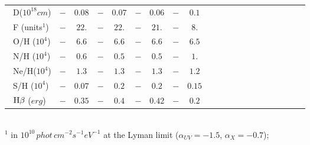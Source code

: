 \documentclass[../thesis.tex]{subfiles}
\begin{document}
\begin{landscape}
\begin{table}
\begin{tabular}{lcccccccccccccccccccc}
\ D($10^{18}\si{cm}$)      &$  -   $&$0.08   $&$  -    $&$0.07 $&$ -   $&$0.06 $&$-    $&$0.1$\\
\ F (units$^1$)       &$ -    $&$ 22.   $&$  -    $&$22. $&$  -   $&$21.  $&$-    $&$8. $\\
\ O/H ($10^{4}$)     &$ -    $&$ 6.6   $&$  -    $&$6.6 $&$  -   $&$6.6  $&$-    $&$6.5 $\\
\ N/H ($10^{4}$)     &$ -    $&$ 0.6   $&$  -    $&$0.5 $&$  -   $&$0.5  $&$-    $&$1.  $\\
\ Ne/H($10^{4}$)     &$-     $&$ 1.3   $&$  -    $&$1.3 $&$  -   $&$1.3  $&$-    $&$1.2 $\\
\ S/H ($10^{4}$)     &$ -    $&$ 0.07  $&$  -    $&$0.2 $&$-     $&$0.2  $&$-    $&$0.15 $\\
\ $\rm H\beta$ ($\si{erg}$)           &$ -   $&$ 0.35  $&$  -    $&$0.4 $&$-     $&$0.42 $&$-    $&$0.2  $\\ \hline
\end{tabular}
\\
$^1$ in $10^{10}\,\si{phot\,cm^{-2} s^{-1} eV^{-1}}$ at the Lyman limit
(${\alpha}_{UV}=-1.5$, ${\alpha}_X=-0.7$);



\end{table}
\end{landscape}
\end{document}
